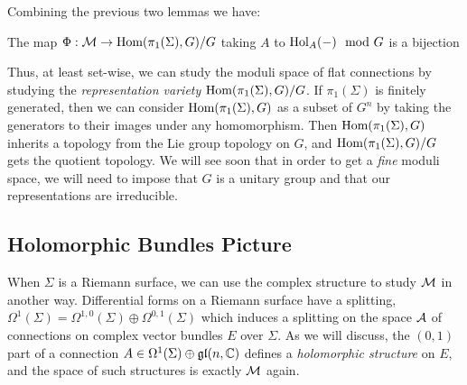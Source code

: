 	Combining the previous two lemmas we have:
	\begin{theorem}
		The map $\Phi:\mathcal{M} \to \text{Hom}(\pi_1(\Sigma), G)/G$ taking $A$ to $\text{Hol}_A(-) \mod G$ is a bijection
	\end{theorem}
	Thus, at least set-wise, we can study the moduli space of flat connections by studying the \textit{representation variety} $\text{Hom}(\pi_1(\Sigma),G)/G$. If $\pi_1(\Sigma)$ is finitely generated, then we can consider $\text{Hom}(\pi_1(\Sigma),G)$ as a subset of $G^n$ by taking the generators to their images under any homomorphism. Then $\text{Hom}(\pi_1(\Sigma),G)$ inherits a topology from the Lie group topology on $G$, and $\text{Hom}(\pi_1(\Sigma),G)/G$ gets the quotient topology. We will see soon that in order to get a \emph{fine} moduli space, we will need to impose that $G$ is a unitary group and that our representations are irreducible.

	\subsection{Holomorphic Bundles Picture}
	When $\Sigma$ is a Riemann surface, we can use the complex structure to study $\mathcal{M}$ in another way. Differential forms on a Riemann surface have a splitting, $\Omega^1(\Sigma) = \Omega^{1,0}(\Sigma)\oplus \Omega^{0,1}(\Sigma)$ which induces a splitting on the space $\mathcal{A}$ of connections on complex vector bundles $E$ over $\Sigma$. As we will discuss, the $(0,1)$ part of a connection $A\in \Omega^1(\Sigma)\oplus \mathfrak{gl}(n,\mathbb{C})$ defines a \emph{holomorphic structure} on $E$, and the space of such structures is exactly $\mathcal{M}$ again.
	
